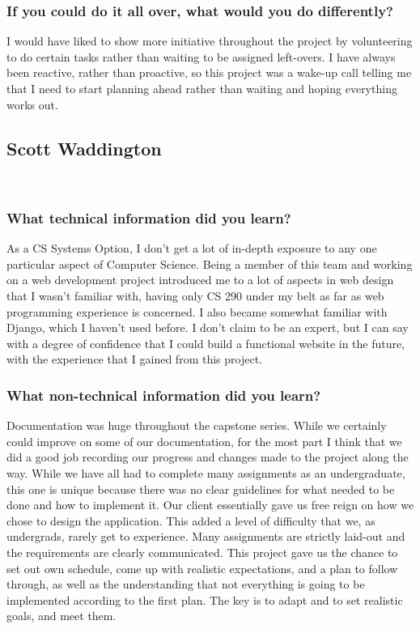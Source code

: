 \subsubsection{If you could do it all over, what would you do differently?}
\noindent I would have liked to show more initiative throughout the project by volunteering to do certain tasks rather than waiting to be assigned left-overs. I have always been reactive, rather than proactive, so this project was a wake-up call telling me that I need to start planning ahead rather than waiting and hoping everything works out.\\

\subsection{Scott Waddington}\\

\subsubsection{What technical information did you learn?}
\noindent As a CS Systems Option, I don't get a lot of in-depth exposure to any one particular aspect of Computer Science. Being a member of this team and working on a web development project introduced me to a lot of aspects in web design that I wasn't familiar with, having only CS 290 under my belt as far as web programming experience is concerned. I also became somewhat familiar with Django, which I haven't used before. I don't claim to be an expert, but I can say with a degree of confidence that I could build a functional website in the future, with the experience that I gained from this project.\\

\subsubsection{What non-technical information did you learn?}
\noindent Documentation was huge throughout the capstone series. While we certainly could improve on some of our documentation, for the most part I think that we did a good job recording our progress and changes made to the project along the way. While we have all had to complete many assignments as an undergraduate, this one is unique because there was no clear guidelines for what needed to be done and how to implement it. Our client essentially gave us free reign on how we chose to design the application. This added a level of difficulty that we, as undergrads, rarely get to experience. Many assignments are strictly laid-out and the requirements are clearly communicated. This project gave us the chance to set out own schedule, come up with realistic expectations, and a plan to follow through, as well as the understanding that not everything is going to be implemented according to the first plan. The key is to adapt and to set realistic goals, and meet them.\\

